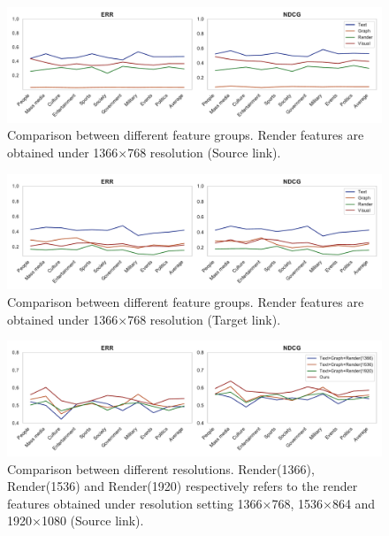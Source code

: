 \begin{figure}[t]
\centering
\includegraphics[width=1\textwidth]{exp_tab2_src}
\caption{Comparison between different feature groups. Render features are obtained under 1366$\times$768 resolution (Source link).}
\label{table_cmp3}
\end{figure}

\begin{figure}[t]
\centering
\includegraphics[width=1\textwidth]{exp_tab2_tgt}
\caption{Comparison between different feature groups. Render features are obtained under 1366$\times$768 resolution (Target link).}
\label{table_cmp4}
\end{figure}

\begin{figure}[t]
\centering
\includegraphics[width=1\textwidth]{exp_tab3_src}
\caption{Comparison between different resolutions. Render(1366), Render(1536) and Render(1920) respectively refers to the render features obtained under resolution setting 1366$\times$768, 1536$\times$864 and 1920$\times$1080 (Source link).}
\label{table_cmp5}
\end{figure}

